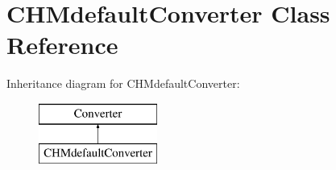\hypertarget{class_c_h_mdefault_converter}{\section{\-C\-H\-Mdefault\-Converter \-Class \-Reference}
\label{class_c_h_mdefault_converter}
}
\-Inheritance diagram for \-C\-H\-Mdefault\-Converter\-:\begin{figure}[H]
\begin{center}
\leavevmode
\includegraphics[height=2.000000cm]{class_c_h_mdefault_converter}
\end{center}
\end{figure}
